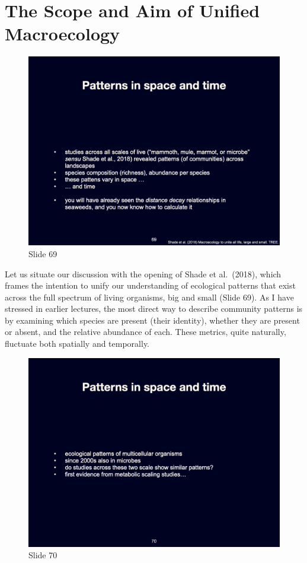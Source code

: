 \documentclass[
  11pt,
]{book}
\begin{document}
\section{The Scope and Aim of Unified
Macroecology}\label{the-scope-and-aim-of-unified-macroecology}

\begin{figure}[ht]
\centering
\includegraphics[width=0.8\linewidth]{../images/BDC334/BDC334-069.jpeg}
\caption*{Slide 69}
\end{figure}

Let us situate our discussion with the opening of Shade et al.~(2018),
which frames the intention to unify our understanding of ecological
patterns that exist across the full spectrum of living organisms, big
and small (Slide 69). As I have stressed in earlier lectures, the most
direct way to describe community patterns is by examining which species
are present (their identity), whether they are present or absent, and
the relative abundance of each. These metrics, quite naturally,
fluctuate both spatially and temporally.

\begin{figure}[ht]
\centering
\includegraphics[width=0.8\linewidth]{../images/BDC334/BDC334-070.jpeg}
\caption*{Slide 70}
\end{figure}
\end{document}
